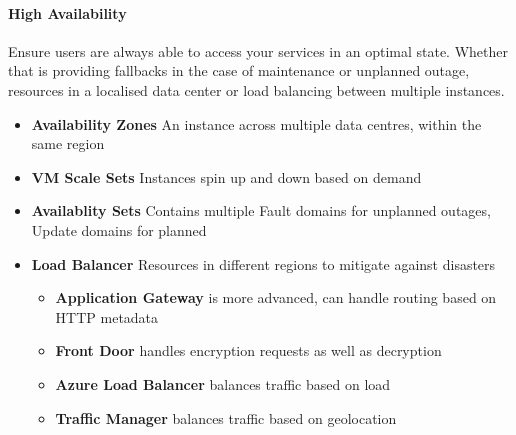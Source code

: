 \documentclass[a4paper,14pt]{report}
\begin{document}
    \paragraph{High Availability}
    Ensure users are always able to access your services in an optimal state. Whether that is providing fallbacks in the
    case of maintenance or unplanned outage, resources in a localised data center or load balancing between multiple instances.
    \\
    \begin{itemize}
        \item \textbf{Availability Zones} An instance across multiple data centres, within the same region
        \item \textbf{VM Scale Sets} Instances spin up and down based on demand
        \item \textbf{Availablity Sets} Contains multiple Fault domains for unplanned outages, Update domains for planned
        \item \textbf{Load Balancer} Resources in different regions to mitigate against disasters
        \begin{itemize}
            \item \textbf{Application Gateway} is more advanced, can handle routing based on HTTP metadata
            \item \textbf{Front Door} handles encryption requests as well as decryption
            \item \textbf{Azure Load Balancer} balances traffic based on load
            \item \textbf{Traffic Manager} balances traffic based on geolocation
        \end{itemize}
    \end{itemize}
\end{document}

